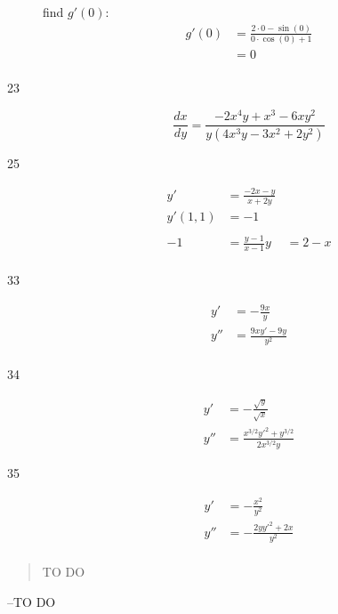 \documentclass[letterpaper, landscape]{exam}
\begin{document}
\begin{description}
      find $g'(0)$:
      \begin{align*}
        g'(0) & = \frac{2 \cdot 0 - \sin (0) }{0 \cdot \cos (0) + 1} \\
              & = \boxed{ 0 } \\
      \end{align*}

    \item[23] 
      \[
        \frac{dx}{dy} = \frac{-2 x^4 y+x^3-6 x y^2}{y \left(4 x^3 y-3 x^2+2 y^2\right)}
      \]

    \item[25] 
      \begin{align*}
        y'       & = \frac{ - 2x - y}{x + 2 y} \\
        y'(1, 1) & = -1 \\
        \\
        -1       & = \frac{y - 1}{x - 1}
        y        & = 2 - x \\
      \end{align*}

    \item[33]
      \begin{align*}
        y'  & = - \frac{9x}{y} \\
        y'' & = \frac{9xy' - 9y}{y^2} \\
      \end{align*}

    \item[34] 
      \begin{align*}
        y'  & = - \frac{\sqrt{y}}{\sqrt{x}} \\
        y'' & = \frac{x^{3/2} y'^2 + y^{3/2}}{2x^{3/2} y}
      \end{align*}

    \item[35] 
      \begin{align*}
        y'  & = - \frac{x^2}{y^2} \\
        y'' & = - \frac{2yy'^2 + 2x}{y^2} \\
      \end{align*}
  \end{description}

  \else
    \vspace{10 cm}
    \begin{quote}
      \begin{em}
        TO DO
      \end{em}
    \end{quote}
    \hspace{2 cm} --TO DO
  \fi
\end{document}
